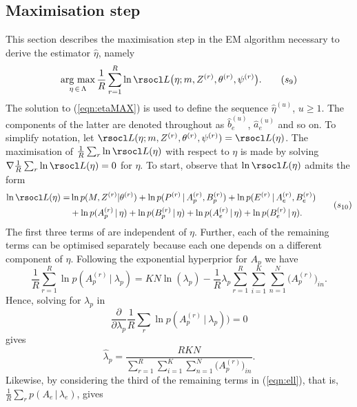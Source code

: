 \documentclass[11pt]{amsart}
\theoremstyle{definition}
\theoremstyle{remark}
\begin{document}
\subsection{Maximisation step}
This section describes the maximisation step in the EM algorithm
necessary to derive the estimator $\hat\eta$, namely
\begin{equation}
   \label{eqn:etaMAX}
    \underset{\eta\,\in\,\Lambda}{\text{arg max}}\,
    \frac{1}{R}\sum_{r=1}^R \ln \rsocl L\big(\eta; m, Z^{(r)},
    \theta^{(r)}, \psi^{(r)}\big). \tag{$s_9$} 
\end{equation}
The solution to (\ref{eqn:etaMAX}) is used to define the sequence
$\hat\eta^{(u)}$, $u \geq 1$. The components of the latter are denoted
throughout as $\hat b_e^{(u)}$, $\hat a_e^{(u)}$ and so on.  To
simplify notation, let $\rsocl L(\eta; m, Z^{(r)}, \theta^{(r)},
\psi^{(r)}) = \rsocl L(\eta)$. The maximisation of
$\frac{1}{R}\sum_{r} \ln \rsocl L(\eta)$ with respect to $\eta$ is
made by solving $\nabla\frac{1}{R}\sum_{r}\ln \rsocl L(\eta) = 0$ for
$\eta$.  To start, observe that $\ln \rsocl L(\eta)$
 admits the form
\begin{equation}
 \label{eqn:ell}
 \begin{aligned}
  \ln \rsocl L(\eta)
  =&
  \ln p(M, Z^{(r)} | \theta^{(r)})  + \ln p(P^{(r)}\,|\, A_p^{(r)},
  B_p^{(r)}) + \ln p(E^{(r)}\,|\, A_e^{(r)},  B_e^{(r)})  \\
  &+
  \ln p(A_p^{(r)}\,|\, \eta) + \ln p(B_p^{(r)}\,|\, \eta) +
  \ln p(A_e^{(r)}\,|\, \eta) + \ln p(B_e^{(r)}\,|\, \eta).
 \end{aligned}
 \tag{$s_{10}$}
\end{equation}
The first three terms of are independent of
$\eta$. Further, each of the remaining terms can be optimised
separately because each one depends on a different component of
$\eta$. Following the exponential hyperprior for $A_p$ we have
\[
   \frac{1}{R}\sum_{r=1}^R \ln  p(A_p^{(r)}\,|\ \lambda_p)
  = 
  KN\ln(\lambda_p) - \frac{1}{R}\lambda_p
  \sum_{r=1}^R\sum_{i=1}^K\sum_{n=1}^N \big(A_p^{(r)}\big)_{in}.
\]
Hence, solving for $\lambda_p$ in 
\[
  \frac{\partial}{\partial\lambda_p} \frac{1}{R}\sum_r \ln
  p(A_p^{(r)}\,|\ \lambda_p)) = 0
\] 
gives
\[
  \widehat\lambda_p = \frac{RKN}{\sum_{r=1}^R \sum_{i=1}^K 
    \sum_{n=1}^N \big(A_p^{(r)}\big)_{in}}.
\]
Likewise, by considering the third of the remaining terms in
(\ref{eqn:ell}), that is, $\frac{1}{R} \sum_r 
p(A_e\,|\, \lambda_e)$, gives
\end{document}

